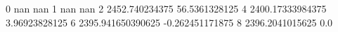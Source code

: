 0 nan nan
1 nan nan
2 2452.740234375 56.5361328125
4 2400.17333984375 3.96923828125
6 2395.941650390625 -0.262451171875
8 2396.2041015625 0.0
